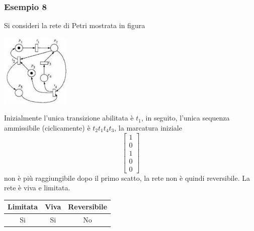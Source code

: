 \documentclass[10pt, letterpaper]{report}
\begin{document}
\subsubsection{Esempio 8}
Si consideri la rete di Petri mostrata in figura
\begin{center}
    \includegraphics[width=0.25\textwidth]{images/PetriEs8.png}
\end{center}
Inizialmente l'unica transizione abilitata è $t_1$, in seguito, l'unica sequenza ammissibile (ciclicamente) è $t_2t_1t_4t_3$, la marcatura iniziale $$ \begin{bmatrix}
    1\\ 0 \\ 1 \\ 0 \\ 0
\end{bmatrix}$$ non è più raggiungibile dopo il primo scatto, la rete non è quindi reversibile. La rete è viva e limitata.
\begin{center}
    \begin{tabular}{|c|c|c|}
        \hline
        \rowcolor[HTML]{EFEFEF} 
        Limitata & Viva & Reversibile \\ \hline
        Si       & Si   & No          \\ \hline
        \end{tabular}
\end{center}
\flowerLine 
\end{document}
